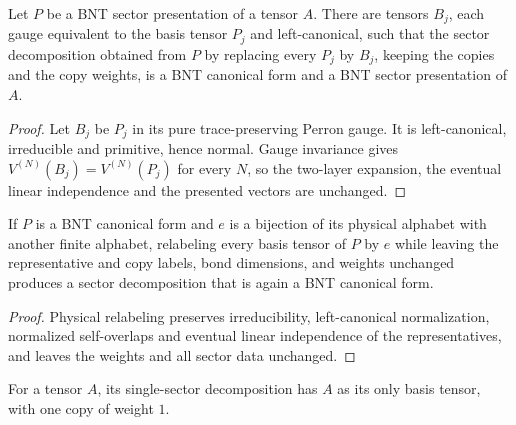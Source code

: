\begin{lemma}
    \label{lem:bnt_presentation_left_canonical_gauge}
    \leanok
    Let $P$ be a BNT sector presentation of a tensor $A$. There are tensors
    $B_j$, each gauge equivalent to the basis tensor $P_j$ and left-canonical,
    such that the sector decomposition obtained from $P$ by replacing every
    $P_j$ by $B_j$, keeping the copies and the copy weights, is a BNT
    canonical form and a BNT sector presentation of $A$.
\end{lemma}

\begin{proof}\leanok
    Let $B_j$ be $P_j$ in its pure trace-preserving Perron gauge. It is
    left-canonical, irreducible and primitive, hence normal. Gauge invariance
    gives $V^{(N)}(B_j)=V^{(N)}(P_j)$ for every $N$, so the two-layer
    expansion, the eventual linear independence and the presented vectors are
    unchanged.
\end{proof}

\begin{lemma}
    \label{thm:sector_bnt_cf_reindex_physical}
    \leanok
    If $P$ is a BNT canonical form and $e$ is a bijection of its physical
    alphabet with another finite alphabet, relabeling every basis tensor of $P$
    by $e$ while leaving the representative and copy labels, bond dimensions,
    and weights unchanged produces a sector decomposition that is again a BNT
    canonical form.
\end{lemma}

\begin{proof}\leanok
    Physical relabeling preserves irreducibility, left-canonical
    normalization, normalized self-overlaps and eventual linear independence
    of the representatives, and leaves the weights and all sector data
    unchanged.
\end{proof}

\begin{definition}
    \label{def:single_sector_decomposition}
    \leanok
    For a tensor $A$, its single-sector decomposition has $A$ as its only
    basis tensor, with one copy of weight $1$.
\end{definition}

